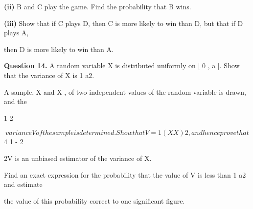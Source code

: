 \documentclass[12pt]{article}
\begin{document}
\begin{flushleft}
\textbf{(ii)} B and C play the game. Find the probability that B wins.\par
\textbf{(iii)} Show that if C plays D, then C is more likely to win than D, but that if D plays A,\par
then D is more likely to win than A.\par
\bigskip\textbf{Question 14.} A random variable X is distributed uniformly on [ 0 , a ]. Show that the variance of X is 1 a2.\par
A sample, X and X , of two independent values of the random variable is drawn, and the\par
1 2\par
\[variance V of the sample is determined. Show that V = 1 (X X )2, and hence prove that\]
4 1 - 2\par
2V is an unbiased estimator of the variance of X.\par
Find an exact expression for the probability that the value of V is less than 1 a2 and estimate\par
the value of this probability correct to one significant figure.\par
\end{flushleft}
\end{document}
